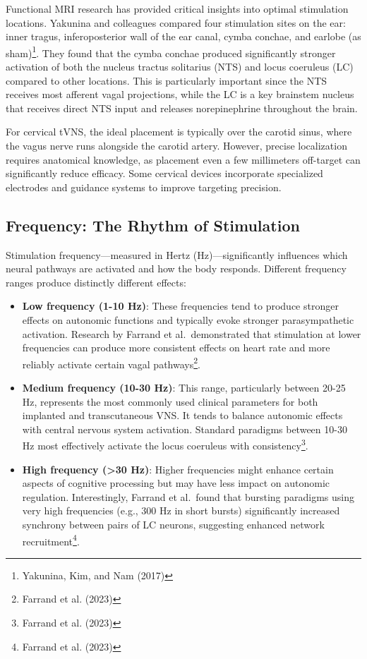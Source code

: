 \documentclass[
  Letterpaper,
]{scrbook}
\begin{document}
Functional MRI research has provided critical insights into optimal
stimulation locations. Yakunina and colleagues compared four stimulation
sites on the ear: inner tragus, inferoposterior wall of the ear canal,
cymba conchae, and earlobe (as sham)\footnote{Yakunina, Kim, and Nam
  (2017)}. They found that the cymba conchae produced significantly
stronger activation of both the nucleus tractus solitarius (NTS) and
locus coeruleus (LC) compared to other locations. This is particularly
important since the NTS receives most afferent vagal projections, while
the LC is a key brainstem nucleus that receives direct NTS input and
releases norepinephrine throughout the brain.

For cervical tVNS, the ideal placement is typically over the carotid
sinus, where the vagus nerve runs alongside the carotid artery. However,
precise localization requires anatomical knowledge, as placement even a
few millimeters off-target can significantly reduce efficacy. Some
cervical devices incorporate specialized electrodes and guidance systems
to improve targeting precision.

\subsection{Frequency: The Rhythm of
Stimulation}\label{frequency-the-rhythm-of-stimulation}

Stimulation frequency---measured in Hertz (Hz)---significantly
influences which neural pathways are activated and how the body
responds. Different frequency ranges produce distinctly different
effects:

\begin{itemize}
\item
  \textbf{Low frequency (1-10 Hz)}: These frequencies tend to produce
  stronger effects on autonomic functions and typically evoke stronger
  parasympathetic activation. Research by Farrand et al.~demonstrated
  that stimulation at lower frequencies can produce more consistent
  effects on heart rate and more reliably activate certain vagal
  pathways\footnote{Farrand et al. (2023)}.
\item
  \textbf{Medium frequency (10-30 Hz)}: This range, particularly between
  20-25 Hz, represents the most commonly used clinical parameters for
  both implanted and transcutaneous VNS. It tends to balance autonomic
  effects with central nervous system activation. Standard paradigms
  between 10-30 Hz most effectively activate the locus coeruleus with
  consistency\footnote{Farrand et al. (2023)}.
\item
  \textbf{High frequency (\textgreater30 Hz)}: Higher frequencies might
  enhance certain aspects of cognitive processing but may have less
  impact on autonomic regulation. Interestingly, Farrand et al.~found
  that bursting paradigms using very high frequencies (e.g., 300 Hz in
  short bursts) significantly increased synchrony between pairs of LC
  neurons, suggesting enhanced network recruitment\footnote{Farrand et
    al. (2023)}.
\end{itemize}
\end{document}
